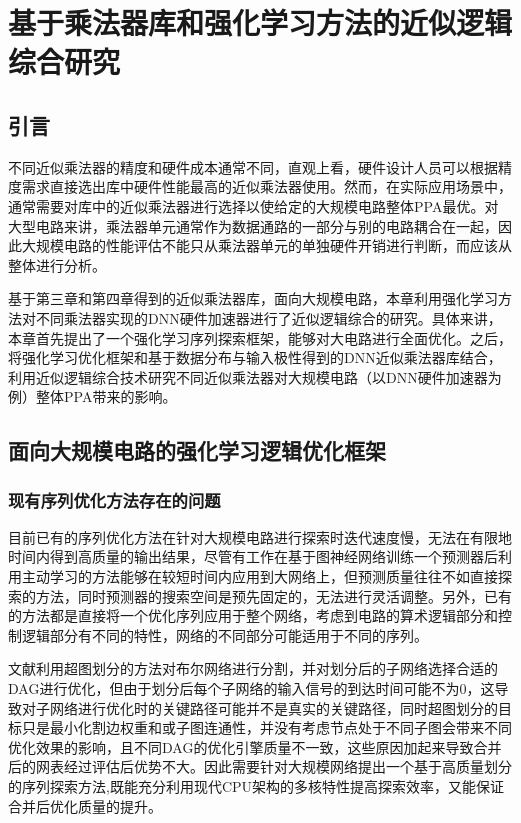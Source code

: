 \chapter{基于乘法器库和强化学习方法的近似逻辑综合研究}

\section{引言}

不同近似乘法器的精度和硬件成本通常不同，直观上看，硬件设计人员可以根据精度需求直接选出库中硬件性能最高的近似乘法器使用。然而，在实际应用场景中，通常需要对库中的近似乘法器进行选择以使给定的大规模电路整体PPA最优。对大型电路来讲，乘法器单元通常作为数据通路的一部分与别的电路耦合在一起，因此大规模电路的性能评估不能只从乘法器单元的单独硬件开销进行判断，而应该从整体进行分析。

基于第三章和第四章得到的近似乘法器库，面向大规模电路，本章利用强化学习方法对不同乘法器实现的DNN硬件加速器进行了近似逻辑综合的研究。具体来讲，本章首先提出了一个强化学习序列探索框架，能够对大电路进行全面优化。之后，将强化学习优化框架和基于数据分布与输入极性得到的DNN近似乘法器库结合，利用近似逻辑综合技术研究不同近似乘法器对大规模电路（以DNN硬件加速器为例）整体PPA带来的影响。

\section{面向大规模电路的强化学习逻辑优化框架}

\subsection{现有序列优化方法存在的问题}

目前已有的序列优化方法\cite{LS:BOiLS,LS:DRiLLS}在针对大规模电路进行探索时迭代速度慢，无法在有限地时间内得到高质量的输出结果，尽管有工作\cite{LS:Bulls-Eye}在基于图神经网络训练一个预测器后利用主动学习的方法能够在较短时间内应用到大网络上，但预测质量往往不如直接探索的方法，同时预测器的搜索空间是预先固定的，无法进行灵活调整。另外，已有的方法都是直接将一个优化序列应用于整个网络，考虑到电路的算术逻辑部分和控制逻辑部分有不同的特性\cite{LS:MIG}，网络的不同部分可能适用于不同的序列。

文献\cite{LS:LSOracle}利用超图划分的方法对布尔网络进行分割，并对划分后的子网络选择合适的DAG进行优化，但由于划分后每个子网络的输入信号的到达时间可能不为0，这导致对子网络进行优化时的关键路径可能并不是真实的关键路径，同时超图划分的目标只是最小化割边权重和或子图连通性，并没有考虑节点处于不同子图会带来不同优化效果的影响，且不同DAG的优化引擎质量不一致，这些原因加起来导致合并后的网表经过评估后优势不大。因此需要针对大规模网络提出一个基于高质量划分的序列探索方法,既能充分利用现代CPU架构的多核特性提高探索效率，又能保证合并后优化质量的提升。


